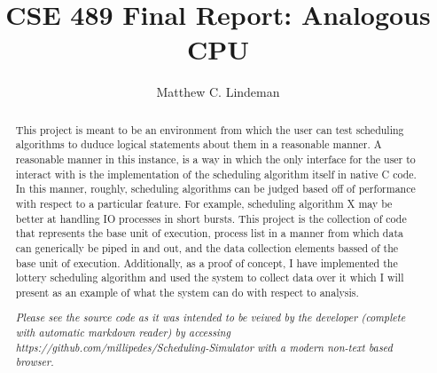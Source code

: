 \documentclass[acmsmall]{acmart}
\begin{document}
\title{CSE 489 Final Report: Analogous CPU}

\author{Matthew C. Lindeman}

\renewcommand{\shortauthors}{Matthew C. Lindeman}

\begin{abstract}
  This project is meant to be an environment from which the user can test
  scheduling algorithms to duduce logical statements about them in a reasonable
  manner. A reasonable manner in this instance, is a way in which the only
  interface for the user to interact with is the implementation of the
  scheduling algorithm itself in native C code. In this manner, roughly, scheduling algorithms
  can be judged based off of performance with respect to a particular feature.
  For example, scheduling algorithm X may be better at handling IO processes in
  short bursts. This project is the collection of code that represents the base
  unit of execution, process list in a manner from which data can
  generically be piped in and out, and the data collection elements bassed of
  the base unit of execution. Additionally, as a proof of concept, I have
  implemented the lottery scheduling algorithm and used the system to collect
  data over it which I will present as an example of what the system can do with
  respect to analysis.
  \par
  {\it Please see the source code as it was intended to be veiwed by the developer
  (complete with automatic markdown reader) by accessing
  https://github.com/millipedes/Scheduling-Simulator with a modern non-text
  based browser.}
\end{abstract}
\end{document}
